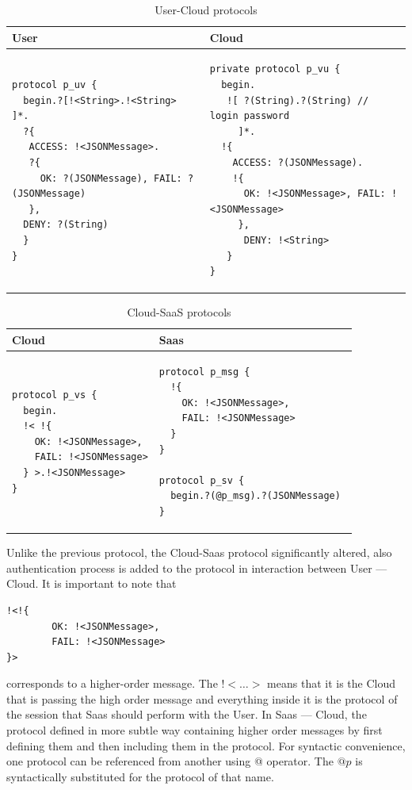 \documentclass{llncs}
\begin{document}
{
\lstset{
framerule=0pt,
numbers=none
}
\begin{longtable}{|p{}|p{}|}
\caption{User-Cloud protocols}\label{tab:user-cloud-protocol} \\ \hline
User & Cloud \\ \hline \endhead
\begin{lstlisting}
protocol p_uv { 
  begin.?[!<String>.!<String> ]*.
  ?{
   ACCESS: !<JSONMessage>.
   ?{
     OK: ?(JSONMessage), FAIL: ?(JSONMessage)
   },
  DENY: ?(String)
  } 
}
\end{lstlisting}
&
\begin{lstlisting}
private protocol p_vu { 
  begin.
   ![ ?(String).?(String) // login password
     ]*.
  !{
    ACCESS: ?(JSONMessage).
    !{
      OK: !<JSONMessage>, FAIL: !<JSONMessage>
     },
      DENY: !<String>
   } 
}
\end{lstlisting}
\\ \hline
\end{longtable}
}



{
\lstset{
framerule=0pt,
numbers=none
}
\begin{longtable}{|p{}|p{}|}
\caption{Cloud-SaaS protocols}\label{tab:cloud-saas-providers} \\ \hline
Cloud & Saas \\ \hline \endhead
\begin{lstlisting}
protocol p_vs {
  begin.
  !< !{
    OK: !<JSONMessage>, 
    FAIL: !<JSONMessage>
  } >.!<JSONMessage>    
}
\end{lstlisting}
&
\begin{lstlisting}
protocol p_msg { 
  !{
    OK: !<JSONMessage>,
    FAIL: !<JSONMessage> 
  }
}

protocol p_sv {
  begin.?(@p_msg).?(JSONMessage) 
}
\end{lstlisting}
\\ \hline
\end{longtable}
}

Unlike the previous protocol, the Cloud-Saas protocol significantly altered, also authentication process is added to the protocol in interaction between User --- Cloud. It is important to note that 

\begin{lstlisting}
!<!{
        OK: !<JSONMessage>,
        FAIL: !<JSONMessage> 
}>
\end{lstlisting}

corresponds to a higher-order message. The !$<\dots>$ means that it is the Cloud that is passing the high order message and everything inside it is the protocol of the session that Saas should perform with the User. In Saas --- Cloud, the protocol defined in more subtle way containing higher order messages by first defining them and then including them in the protocol. For syntactic convenience, one protocol can be referenced from another using @ operator. The $@p$ is syntactically substituted for the protocol of that name.
\end{document}
